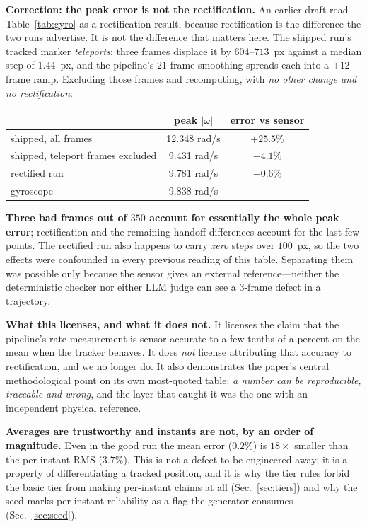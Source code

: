 \documentclass[conference]{IEEEtran}
\begin{document}
\textbf{Correction: the peak error is not the rectification.} An earlier draft
read Table~\ref{tab:gyro} as a rectification result, because rectification is
the difference the two runs advertise. It is not the difference that matters
here. The shipped run's tracked marker \emph{teleports}: three frames displace
it by $604$--$713$~px against a median step of $1.44$~px, and the pipeline's
$21$-frame smoothing spreads each into a $\pm12$-frame ramp. Excluding those
frames and recomputing, with \emph{no other change and no rectification}:

\begin{center}
\footnotesize
\begin{tabular}{@{}lcc@{}}
\toprule
& peak $|\omega|$ & error vs sensor \\
\midrule
shipped, all frames & 12.348 rad/s & $+25.5\%$ \\
shipped, teleport frames excluded & 9.431 rad/s & $\mathbf{-4.1\%}$ \\
rectified run & 9.781 rad/s & $-0.6\%$ \\
\midrule
gyroscope & 9.838 rad/s & --- \\
\bottomrule
\end{tabular}
\end{center}

\textbf{Three bad frames out of $350$ account for essentially the whole peak
error}; rectification and the remaining handoff differences account for the
last few points. The rectified run also happens to carry \emph{zero} steps over
$100$~px, so the two effects were confounded in every previous reading of this
table. Separating them was possible only because the sensor gives an external
reference---neither the deterministic checker nor either LLM judge can see a
$3$-frame defect in a trajectory.

\textbf{What this licenses, and what it does not.} It licenses the claim that
the pipeline's rate measurement is sensor-accurate to a few tenths of a percent
on the mean when the tracker behaves. It does \emph{not} license attributing
that accuracy to rectification, and we no longer do. It also demonstrates the
paper's central methodological point on its own most-quoted table: \emph{a
number can be reproducible, traceable and wrong}, and the layer that caught it
was the one with an independent physical reference.

\textbf{Averages are trustworthy and instants are not, by an order of
magnitude.} Even in the good run the mean error ($0.2\%$) is $18\times$ smaller
than the per-instant RMS ($3.7\%$). This is not a defect to be engineered away;
it is a property of differentiating a tracked position, and it is why the tier
rules forbid the basic tier from making per-instant claims at all
(Sec.~\ref{sec:tiers}) and why the seed marks per-instant reliability as a flag
the generator consumes (Sec.~\ref{sec:seed}).
\end{document}
